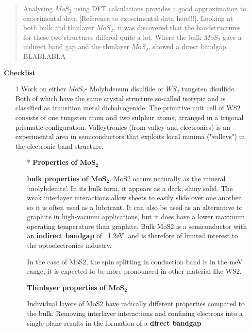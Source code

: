 \documentclass[twoside,onecolumn]{article}
\begin{document}


\begin{abstract}

Analysing $MoS_2$ using DFT calculations provides a good approximation to experimental data [Reference to experimental data here!!!]. Looking at both bulk and thinlayer $MoS_2$, it was discovered that the bandstructures for these two structures differed quite a lot. Where the bulk $MoS_2$ gave a indirect band gap and the thinlayer $MoS_2$, showed a direct bandgap. BLABLABLA

\end{abstract}


{\bf{Checklist}}

\begin{itemize}
\item[1] Work on either $MoS_2$- Molybdenum disulfide or $WS_2$ tungsten disulfide. Both of which have the same crystal structure so-called isotypic and is classified as transition metal dichalcogenide. The primitive unit cell of WS2 consists of one tungsten atom and two sulphur atoms, arranged in a trigonal prismatic configuration. Valleytronics (from valley and electronics) is an experimental area in semiconductors that exploits local minima ("valleys") in the electronic band structure.
\begin{itemize}
\item[*] {\bf Properties of $\mathbf{MoS_2}$}

\bigskip

{\bf bulk properties of $\mathbf{MoS_2}$}. MoS2 occurs naturally as the mineral 'molybdenite'. In its bulk form, it appears as a dark, shiny solid. The weak interlayer interactions allow sheets to easily slide over one another, so it is often used as a lubricant. It can also be used as an alternative to graphite in high-vacuum applications, but it does have a lower maximum operating temperature than graphite. Bulk MoS2 is a semiconductor with an {\bf{indirect bandgap}} of ~1.2eV, and is therefore of limited interest to the optoelectronics industry.

In the case of MoS2, the spin splitting in conduction band is in the meV range, it is expected to be more pronounced in other material like WS2.

\bigskip

{\bf Thinlayer properties of $\mathbf{MoS_2}$}

Individual layers of MoS2 have radically different properties compared to the bulk. Removing interlayer interactions and confining electrons into a single plane results in the formation of a {\bf{direct bandgap}}


\end{itemize}
\end{itemize}
\end{document}
